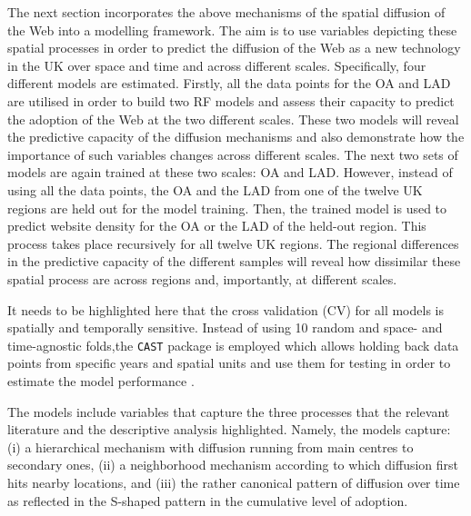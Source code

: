 \documentclass[
  authoryear,
  preprint,
  3p]{elsarticle}
\begin{document}
The next section incorporates the above mechanisms of the spatial
diffusion of the Web into a modelling framework. The aim is to use
variables depicting these spatial processes in order to predict the
diffusion of the Web as a new technology in the UK over space and time
and across different scales. Specifically, four different models are
estimated. Firstly, all the data points for the OA and LAD are utilised
in order to build two RF models and assess their capacity to predict the
adoption of the Web at the two different scales. These two models will
reveal the predictive capacity of the diffusion mechanisms and also
demonstrate how the importance of such variables changes across
different scales. The next two sets of models are again trained at these
two scales: OA and LAD. However, instead of using all the data points,
the OA and the LAD from one of the twelve UK regions are held out for
the model training. Then, the trained model is used to predict website
density for the OA or the LAD of the held-out region. This process takes
place recursively for all twelve UK regions. The regional differences in
the predictive capacity of the different samples will reveal how
dissimilar these spatial process are across regions and, importantly, at
different scales.

It needs to be highlighted here that the cross validation (CV) for all
models is spatially and temporally sensitive. Instead of using 10 random
and space- and time-agnostic folds,the \texttt{CAST} package is employed
which allows holding back data points from specific years and spatial
units and use them for testing in order to estimate the model
performance \citep{meyer2018improving}.

The models include variables that capture the three processes that the
relevant literature and the descriptive analysis highlighted. Namely,
the models capture: (i) a hierarchical mechanism with diffusion running
from main centres to secondary ones, (ii) a neighborhood mechanism
according to which diffusion first hits nearby locations, and (iii) the
rather canonical pattern of diffusion over time as reflected in the
S-shaped pattern in the cumulative level of adoption.
\end{document}
